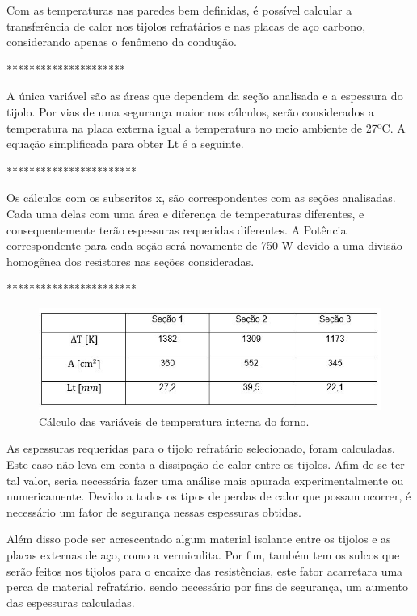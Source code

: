 Com as temperaturas nas paredes bem definidas, é possível calcular a transferência de calor nos tijolos refratários e nas placas de aço carbono, considerando apenas o fenômeno da condução.



*********************



 A única variável são as áreas que dependem da seção analisada e a espessura do tijolo. Por vias de uma segurança maior nos cálculos, serão considerados a temperatura na placa externa igual a temperatura no meio ambiente de 27ºC. A equação simplificada para obter Lt é a seguinte.
 
 
 
 ***********************
 
 
 
 
Os cálculos com os subscritos x, são correspondentes com as seções analisadas. Cada uma delas com uma área e diferença de temperaturas diferentes, e consequentemente terão espessuras requeridas diferentes. A Potência correspondente para cada seção será novamente de 750 W devido a uma divisão homogênea dos resistores nas seções consideradas.
 
 
***********************


\begin{figure}[h]
	\centering
	\label{tab}
	\includegraphics[keepaspectratio=true,scale=1.0]{figuras/tab.JPG}
	\caption{Cálculo das variáveis de temperatura interna do forno.}
\end{figure}

As espessuras requeridas para o tijolo refratário selecionado, foram calculadas. Este caso não leva em conta a dissipação de calor entre os tijolos. Afim de se ter tal valor, seria necessária fazer uma análise mais apurada experimentalmente ou numericamente.
Devido a todos os tipos de perdas de calor que possam ocorrer, é necessário um fator de segurança nessas espessuras obtidas. 

Além disso pode ser acrescentado algum material isolante entre os tijolos e as placas externas de aço, como a vermiculita.
Por fim, também tem os sulcos que serão feitos nos tijolos para o encaixe das resistências, este fator acarretara uma perca de material refratário, sendo necessário por fins de segurança, um aumento das espessuras calculadas.

